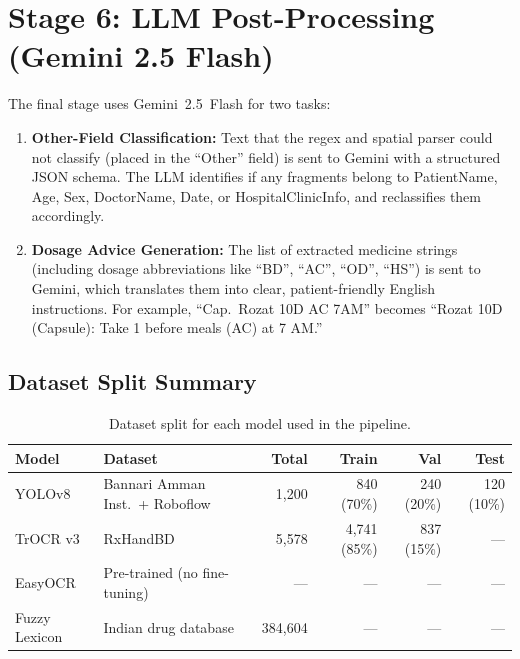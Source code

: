 \documentclass[12pt,a4paper,oneside]{report}
\begin{document}
\section{Stage 6: LLM Post-Processing (Gemini 2.5 Flash)}

The final stage uses Gemini~2.5~Flash for two tasks:

\begin{enumerate}
  \item \textbf{Other-Field Classification:} Text that the regex and spatial parser could not classify (placed in the ``Other'' field) is sent to Gemini with a structured JSON schema. The LLM identifies if any fragments belong to PatientName, Age, Sex, DoctorName, Date, or HospitalClinicInfo, and reclassifies them accordingly.

  \item \textbf{Dosage Advice Generation:} The list of extracted medicine strings (including dosage abbreviations like ``BD'', ``AC'', ``OD'', ``HS'') is sent to Gemini, which translates them into clear, patient-friendly English instructions. For example, ``Cap.\ Rozat 10D AC 7AM'' becomes ``Rozat 10D (Capsule): Take 1 before meals (AC) at 7 AM.''
\end{enumerate}

\subsection{Dataset Split Summary}

\begin{table}[H]
\centering
\caption{Dataset split for each model used in the pipeline.}
\label{tab:dataset_splits}
\begin{tabular}{l l r r r r}
\toprule
\textbf{Model} & \textbf{Dataset} & \textbf{Total} & \textbf{Train} & \textbf{Val} & \textbf{Test} \\
\midrule
YOLOv8 & Bannari Amman Inst.\ + Roboflow & 1{,}200 & 840 (70\%) & 240 (20\%) & 120 (10\%) \\
TrOCR v3 & RxHandBD & 5{,}578 & 4{,}741 (85\%) & 837 (15\%) & --- \\
EasyOCR & Pre-trained (no fine-tuning) & --- & --- & --- & --- \\
Fuzzy Lexicon & Indian drug database & 384{,}604 & --- & --- & --- \\
\bottomrule
\end{tabular}
\end{table}


\end{document}
